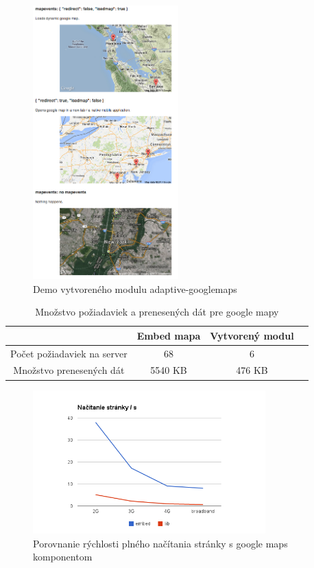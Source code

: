 \begin{figure}[H]
  \centering
  \includegraphics[width=0.5\textwidth]{img/adaptivegooglemaps.png}
  \caption[Demo vytvoreného modulu adaptive-googlemaps]{
    Demo vytvoreného modulu adaptive-googlemaps}
  \label{fig: adaptivemotion}
\end{figure}

\begin{table}[H]
  \begin{tabular}{ |c|c|c|c| }
    \hline
    & Embed mapa & Vytvorený modul \\ \hline
    Počet požiadaviek na server & 68 & 6 \\  \hline
    Množstvo prenesených dát  & 5540 KB & 476 KB  \\
    \hline
  \end{tabular}
  \caption[Množstvo požiadaviek a prenesených dát pre google mapy]{Množstvo požiadaviek a prenesených dát pre google mapy}
\end{table}

\begin{figure}[H]
  \centering
  \includegraphics[width=0.8\textwidth]{img/load/gmaps-fullload.png}
  \caption[Porovnanie rýchlosti plného načítania stránky s google maps komponentom]{
    Porovnanie rýchlosti plného načítania stránky s google maps komponentom}
  \label{fig: gmaps-fullload}
\end{figure}

